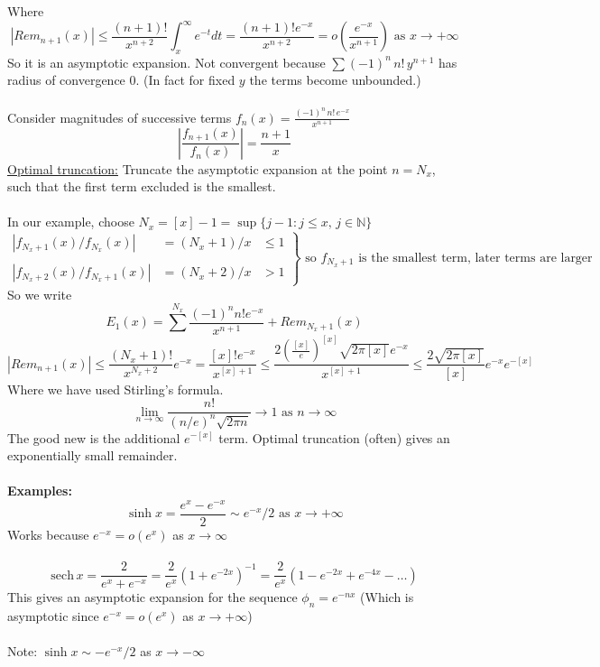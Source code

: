 \documentclass{article}
\newcommand{\examples}{\textbf{Examples:}}
\begin{document}
Where
\[ |Rem_{n+1}(x)| \leq \frac{(n+1)!}{x^{n+2}} \int_x^{\infty} e^{-t} dt =
\frac{(n+1)! e^{-x}}{x^{n+2}} = o\left( \frac{e^{-x}}{x^{n+1}} \right) 
\mbox{ as } x \to + \infty \]
So it is an asymptotic expansion. Not convergent because 
$\displaystyle \sum (-1)^n \,n! \, y^{n+1}$
has radius of convergence 0. (In fact for fixed $y$ the terms become unbounded.)
\\
\\
Consider magnitudes of successive terms $\displaystyle 
f_n(x) =\frac{ (-1)^n\, n!\, e^{-x}}{x^{n+1}}$
\[ \left| \frac{f_{n+1}(x)}{f_n(x)}\right| = \frac{n+1}{x} \]
\underline{Optimal truncation:} Truncate the asymptotic expansion at the 
point $n=N_x$, such that the first term excluded is the smallest.
\\
\\
In our example, choose $N_x = [x] -1 = \sup \{j-1: j \leq x, \, j\in \mathbb{N} \}$
\[ \left. \begin{array}{ccc}
\left| f_{N_x+1}(x)/f_{N_x}(x)\right| &= (N_x+1)/x &\leq 1 \\
\\
\left| f_{N_x+2}(x)/f_{N_x+1}(x)\right| &= (N_x+2)/x &> 1 \end{array}
\right\} \mbox{ so } f_{N_x+1} \mbox{ is the smallest term, later terms are larger} \]
So we write
\[ E_1(x) = \sum^{N_x} \frac{(-1)^n n! e^{-x}}{x^{n+1}} + Rem_{N_x+1}(x) \]
\[ |Rem_{n+1}(x)| \leq \frac{(N_x+1)!}{x^{N_x+2}}e^{-x} =
\frac{[x]! e^{-x}}{x^{[x]+1}} \leq
\frac{2 \left( \frac{[x]}{e} \right)^{[x]} \sqrt{2\pi [x]} e^{-x}}{x^{[x]+1}}
\leq \frac{2\sqrt{2\pi[x]}}{[x]} e^{-x} e^{-[x]} \]
Where we have used Stirling's formula. 
\[ \lim_{n \to \infty} \frac{n!}{(n/e)^n \sqrt{2\pi n}} \to 1 \mbox{ as } n \to \infty \]
The good new is the additional 
$e^{-[x]}$ term. Optimal truncation (often) gives an exponentially small 
remainder.
\\
\\
\examples\
\[ \sinh x = \frac{e^x - e^{-x}}{2} \sim e^{-x}/2 \mbox{ as } x \to + \infty \]
Works because $e^{-x} = o(e^x)$ as $x \to \infty$
\\
\\
\[ \mathrm{sech}  \, x = \frac{2}{e^x + e^{-x}} = \frac{2}{e^x}(1 + e^{-2x})^{-1} =
\frac{2}{e^x}(1 - e^{-2x} + e^{-4x} - \dots) \]
This gives an asymptotic expansion for the sequence $\phi_n = e^{-nx}$
(Which is asymptotic since $e^{-x} = o(e^x)$ as $x \to + \infty$)
\\
\\
Note: $\sinh x \sim -e^{-x}/2$ as $x \to -\infty$
\end{document}
